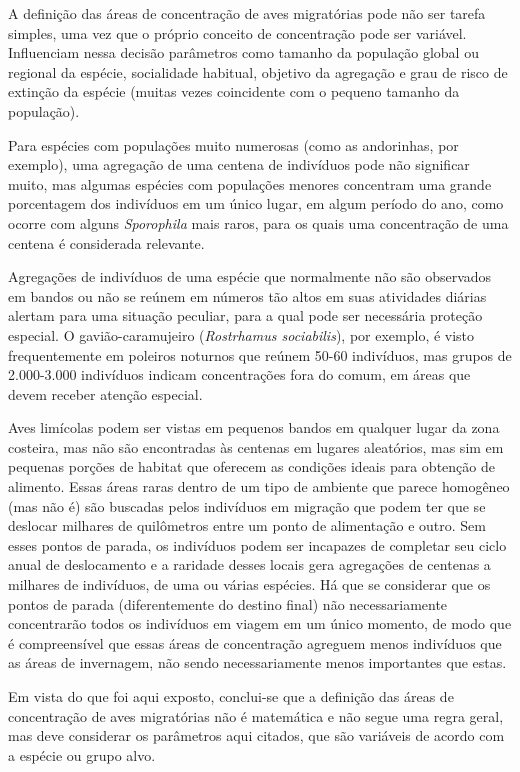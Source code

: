 \documentclass[
  oneside]{scrbook}
\begin{document}
A definição das áreas de concentração de aves migratórias pode não ser tarefa simples, uma vez que o próprio conceito de concentração pode ser variável. Influenciam nessa decisão parâmetros como tamanho da população global ou regional da espécie, socialidade habitual, objetivo da agregação e grau de risco de extinção da espécie (muitas vezes coincidente com o pequeno tamanho da população).

Para espécies com populações muito numerosas (como as andorinhas, por exemplo), uma agregação de uma centena de indivíduos pode não significar muito, mas algumas espécies com populações menores concentram uma grande porcentagem dos indivíduos em um único lugar, em algum período do ano, como ocorre com alguns \emph{Sporophila} mais raros, para os quais uma concentração de uma centena é considerada relevante.

Agregações de indivíduos de uma espécie que normalmente não são observados em bandos ou não se reúnem em números tão altos em suas atividades diárias alertam para uma situação peculiar, para a qual pode ser necessária proteção especial. O gavião-caramujeiro (\emph{Rostrhamus sociabilis}), por exemplo, é visto frequentemente em poleiros noturnos que reúnem 50-60 indivíduos, mas grupos de 2.000-3.000 indivíduos indicam concentrações fora do comum, em áreas que devem receber atenção especial.

Aves limícolas podem ser vistas em pequenos bandos em qualquer lugar da zona costeira, mas não são encontradas às centenas em lugares aleatórios, mas sim em pequenas porções de habitat que oferecem as condições ideais para obtenção de alimento. Essas áreas raras dentro de um tipo de ambiente que parece homogêneo (mas não é) são buscadas pelos indivíduos em migração que podem ter que se deslocar milhares de quilômetros entre um ponto de alimentação e outro. Sem esses pontos de parada, os indivíduos podem ser incapazes de completar seu ciclo anual de deslocamento e a raridade desses locais gera agregações de centenas a milhares de indivíduos, de uma ou várias espécies. Há que se considerar que os pontos de parada (diferentemente do destino final) não necessariamente concentrarão todos os indivíduos em viagem em um único momento, de modo que é compreensível que essas áreas de concentração agreguem menos indivíduos que as áreas de invernagem, não sendo necessariamente menos importantes que estas.

Em vista do que foi aqui exposto, conclui-se que a definição das áreas de concentração de aves migratórias não é matemática e não segue uma regra geral, mas deve considerar os parâmetros aqui citados, que são variáveis de acordo com a espécie ou grupo alvo.
\end{document}
